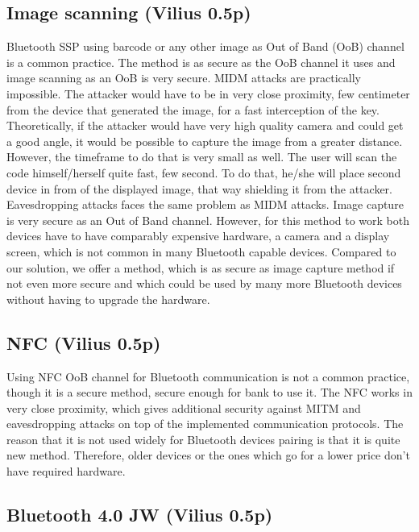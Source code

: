 \documentclass[12pt]{article}
\begin{document}
\subsection{Image scanning (Vilius 0.5p)}
\label{sub:Image scanning}

Bluetooth SSP using barcode or any other image as Out of Band (OoB) channel is a common practice. The method is as secure as the OoB channel it uses and image scanning as an OoB is very secure. MIDM attacks are practically impossible. The attacker would have to be in very close proximity, few centimeter from the device that generated the image, for a fast interception of the key. Theoretically, if the attacker would have very high quality camera and could get a good angle, it would be possible to capture the image from a greater distance. However, the timeframe to do that is very small as well. The user will scan the code himself/herself quite fast, few second. To do that, he/she will place second device in from of the displayed image, that way shielding it from the attacker. Eavesdropping attacks faces the same problem as MIDM attacks.
Image capture is very secure as an Out of Band channel. However, for this method to work both devices have to have comparably expensive hardware, a camera and a display screen, which is not common in many Bluetooth capable devices. Compared to our solution, we offer a method, which is as secure as image capture method if not even more secure and which could be used by many more Bluetooth devices without having to upgrade the hardware.


\subsection{NFC (Vilius 0.5p)}
\label{sub:Image scanning}

Using NFC OoB channel for Bluetooth communication is not a common practice, though it is a secure method, secure enough for bank to use it. The NFC works in very close proximity, which gives additional security against MITM and eavesdropping attacks on top of the implemented communication protocols. The reason that it is not used widely for Bluetooth devices pairing is that it is quite new method. Therefore, older devices or the ones which go for a lower price don’t have required hardware.

\newpage
\subsection{Bluetooth 4.0 JW (Vilius 0.5p)}
\label{sub:Bluetooth 4.0 JW}
\end{document}
